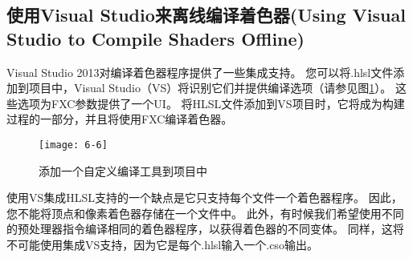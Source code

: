 \subsection{使用Visual Studio来离线编译着色器(Using Visual Studio to Compile Shaders Offline)}
\begin{flushleft}
Visual Studio 2013对编译着色器程序提供了一些集成支持。 您可以将.hlsl文件添加到项目中，Visual Studio（VS）将识别它们并提供编译选项（请参见图\ref{fig:6-6}）。 这些选项为FXC参数提供了一个UI。 将HLSL文件添加到VS项目时，它将成为构建过程的一部分，并且将使用FXC编译着色器。\\
\begin{figure}[h]
    \texttt{[image: 6-6]}
    \centering
    \caption{添加一个自定义编译工具到项目中}
    \label{fig:6-6}
\end{figure}

使用VS集成HLSL支持的一个缺点是它只支持每个文件一个着色器程序。 因此，您不能将顶点和像素着色器存储在一个文件中。 此外，有时候我们希望使用不同的预处理器指令编译相同的着色器程序，以获得着色器的不同变体。 同样，这将不可能使用集成VS支持，因为它是每个.hlsl输入一个.cso输出。
\end{flushleft}


